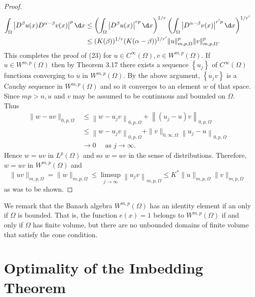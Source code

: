 \begin{proof}
  \[
  \begin{aligned}
  \int_{\Omega}\left|D^\beta u(x) D^{\alpha-\beta} v(x)\right|^p \d x & \leq\left(\int_{\Omega}\left|D^\beta u(x)\right|^{r p} \d x\right)^{1 / r}\left(\int_{\Omega}\left|D^{\alpha-\beta} v(x)\right|^{r^{\prime} p} \d x\right)^{1 / r^{\prime}} \\
  & \leq(K(\beta))^{1 / r}(K(\alpha-\beta))^{1 / r^{\prime}}\|u\|_{m, p, \Omega}^p\|v\|_{m, p, \Omega}^p .
  \end{aligned}
  \]
  This completes the proof of (23) for $u \in C^{\infty}(\Omega), v \in W^{m,p}(\Omega)$.
  If $u \in W^{m,p}(\Omega)$ then by Theorem 3.17 there exists a sequence $\left\{u_j\right\}$ of $C^{\infty}(\Omega)$ functions converging to $u$ in $W^{m,p}(\Omega)$. By the above argument, $\left\{u_j v\right\}$ is a Cauchy sequence in $W^{m,p}(\Omega)$ and so it converges to an element $w$ of that space. Since $m p>n, u$ and $v$ may be assumed to be continuous and bounded on $\Omega$. Thus
  \[
  \begin{aligned}
  \|w-u v\|_{0, p, \Omega} & \leq\left\|w-u_j v\right\|_{0, p, \Omega}+\left\|\left(u_j-u\right) v\right\|_{0, p, \Omega} \\
  & \leq\left\|w-u_j v\right\|_{0, p, \Omega}+\|v\|_{0, \infty, \Omega}\left\|u_j-u\right\|_{0, p, \Omega} \\
  & \rightarrow 0 \quad \text { as } j \rightarrow \infty .
  \end{aligned}
  \]
  Hence $w=u v$ in $L^p(\Omega)$ and so $w=u v$ in the sense of distributions. Therefore, $w=u v$ in $W^{m,p}(\Omega)$ and
  \[
  \|u v\|_{m, p, \Omega}=\|w\|_{m, p, \Omega} \leq \limsup _{j \rightarrow \infty}\left\|u_j v\right\|_{m, p, \Omega} \leq K^*\|u\|_{m, p, \Omega}\|v\|_{m, p, \Omega}
  \]
  as was to be shown.
\end{proof}

We remark that the Banach algebra $W^{m,p}(\Omega)$ has an identity element if an only if $\Omega$ is bounded. 
That is, the function $e(x)=1$ belongs to $W^{m,p}(\Omega)$ if and only if $\Omega$ has finite volume,
but there are no unbounded domains of finite volume that satisfy the cone condition.


\section{Optimality of the Imbedding Theorem}


